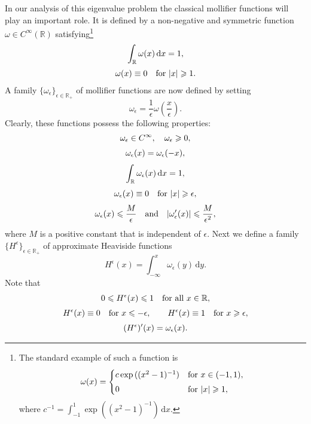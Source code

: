 \documentclass{imanum}
\begin{document}
In our analysis of this eigenvalue problem the classical mollifier
functions
\citep[see, e.g.,][]{BMar86}
will play an important role. It is defined by a non-negative and
symmetric function $\omega \in C^{\infty}(\mathbb{R})$
satisfying\footnote{The standard example of such a function is
\begin{equation*}
\omega(x)=
\begin{cases}
c \exp{((x^2-1)^{-1})} & \hbox{for}\ x \in (-1,1),\\[3pt]
0 & \hbox{for}\ |x| \geq 1 ,
\end{cases}
\end{equation*}
where $c^{-1}=\int_{-1}^1 \exp{((x^2-1)^{-1})} \, \mathrm{d}x$.}
\begin{gather*}
\int_{\mathbb{R}} \omega(x) \, \mathrm{d}x =1, \\[2pt]
\omega(x) \equiv 0 \quad \hbox{for}\ |x| \geq 1.
\end{gather*}
A family $\{ \omega_\epsilon \}_{\epsilon \in \mathbb{R}_+}$
of mollifier functions are now defined by setting
\begin{equation*}
\omega_\epsilon = \frac{1}{\epsilon} \omega
\left( \frac{x}{\epsilon} \right).
\end{equation*}
Clearly, these functions possess the following properties:
\begin{gather}
\omega_\epsilon \in C^\infty, \quad \omega_\epsilon \geq 0,
\label{P1} \\[3pt]
\omega_\epsilon(x) = \omega_\epsilon(-x),
\label{P2} \\[3pt]
\int_{\mathbb{R}} \omega_\epsilon(x) \, \mathrm{d}x =1,
\label{P3} \\[3pt]
\omega_\epsilon(x) \equiv 0 \quad \hbox{for}\ |x| \geq \epsilon,
\label{P4} \\[3pt]
\omega_\epsilon(x) \leq \frac{M}{\epsilon} \quad \hbox{and} \quad
|\omega'_\epsilon(x)| \leq \frac{M}{\epsilon^2},
\label{P5}
\end{gather}
where $M$ is a positive constant that is independent of $\epsilon$.
Next we define a family
$\{ H^\epsilon \}_{\epsilon \in \mathbb{R}_+}$
of approximate Heaviside functions
\begin{equation*}
H^\epsilon(x) = \int_{-\infty}^x \omega_\epsilon(y) \, \mathrm{d}y.
\end{equation*}
Note that
\begin{gather}
0 \leq H^\epsilon(x) \leq 1\quad \hbox{for all}\ x \in \mathbb{R},
\label{P6}\\[3pt]
H^\epsilon(x) \equiv 0 \quad \hbox{for}\ x \leq -\epsilon,
\qquad H^\epsilon(x) \equiv 1 \quad \hbox{for}\ x \geq \epsilon,
\label{P6.1}\\[3pt]
(H^\epsilon)'(x) = \omega_\epsilon(x).
\label{P7}
\end{gather}
\end{document}
